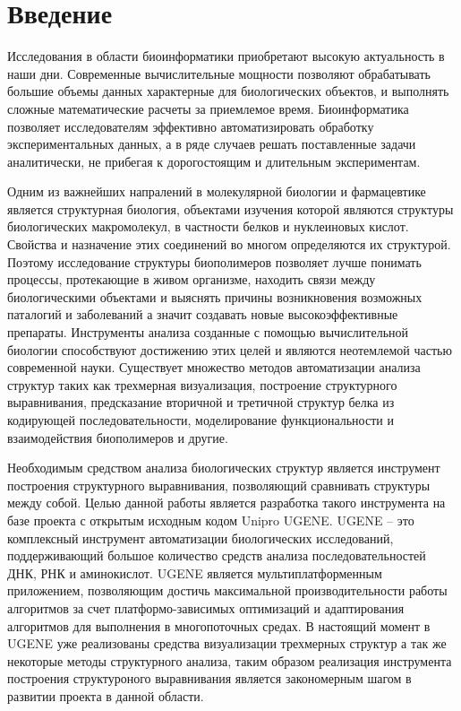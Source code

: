 \documentclass[a4paper, 12pt, titlepage, utf8]{extarticle}
\begin{document}
\tableofcontents
\pagebreak

\section{Введение}	%

Исследования в области биоинформатики приобретают высокую актуальность в наши дни. Современные вычислительные мощности позволяют обрабатывать большие объемы данных характерные для биологических объектов, и выполнять сложные математические расчеты за приемлемое время. Биоинформатика позволяет исследователям эффективно автоматизировать обработку экспериментальных данных, а в ряде случаев решать поставленные задачи аналитически, не прибегая к дорогостоящим и длительным экспериментам.

Одним из важнейших напралений в молекулярной биологии и фармацевтике является структурная биология, объектами изучения которой являются структуры биологических макромолекул, в частности белков и нуклеиновых кислот. Свойства и назначение этих соединений во многом определяются их структурой. Поэтому исследование структуры биополимеров позволяет лучше понимать процессы, протекающие в живом организме, находить связи между биологическими объектами и выяснять причины возникновения возможных паталогий и заболеваний а значит создавать новые высокоэффективные препараты. Инструменты анализа созданные с помощью вычислительной биологии способствуют достижению этих целей и являются неотемлемой частью современной науки. Существует множество методов автоматизации анализа структур таких как трехмерная визуализация, построение структурного выравнивания, предсказание вторичной и третичной структур белка из кодирующей последовательности, моделирование функциональности и взаимодействия биополимеров и другие.

Необходимым средством анализа биологических структур является инструмент построения структурного выравнивания, позволяющий сравнивать структуры между собой. Целью данной работы является разработка такого инструмента на базе проекта с открытым исходным кодом Unipro UGENE. UGENE -- это комплексный инструмент автоматизации биологических исследований, поддерживающий большое количество средств анализа последовательностей ДНК, РНК и аминокислот. UGENE является мультиплатформенным приложением, позволяющим достичь максимальной производительности работы алгоритмов за счет платформо-зависимых оптимизаций и адаптирования алгоритмов для выполнения в многопоточных средах. В настоящий момент в UGENE уже реализованы средства визуализации трехмерных структур а так же некоторые методы структурного анализа, таким образом реализация инструмента построения структуроного выравнивания является закономерным шагом в развитии проекта в данной области.
\end{document}
